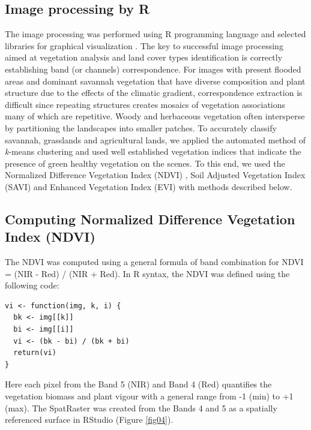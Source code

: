 \documentclass[remotesensing,article,submit,pdftex,moreauthors]{Definitions/mdpi}
\begin{document}
\subsection{Image processing by R}

The image processing was performed using R programming language \cite{RCoreTeam} and selected libraries for graphical visualization \cite{Murrell}. The key to successful image processing aimed at vegetation analysis and land cover types identification is correctly establishing band (or channels) correspondence. For images with present flooded areas and dominant savannah vegetation that have diverse composition and plant structure due to the effects of the climatic gradient, correspondence extraction is difficult since repeating structures creates mosaics of vegetation associations many of which are repetitive. Woody and herbaceous vegetation often intersperse by partitioning the landscapes into smaller patches. To accurately classify savannah, grasslands and agricultural lands, we applied the automated method of \emph{k}-means clustering and used well established vegetation indices that indicate the presence of green healthy vegetation on the scenes. To this end, we used the Normalized Difference Vegetation Index (NDVI) \cite{Tarpley}, Soil Adjusted Vegetation Index (SAVI) \cite{HUETE1988295,Huete} and Enhanced Vegetation Index (EVI) \cite{HUETE2002195} with methods described below. 

\subsection{Computing Normalized Difference Vegetation Index (NDVI)}
The NDVI was computed using a general formula of band combination for NDVI = (NIR - Red) / (NIR + Red). In R syntax, the NDVI was defined using the following code:

\begin{footnotesize}
\begin{verbatim}
vi <- function(img, k, i) {
  bk <- img[[k]]
  bi <- img[[i]]
  vi <- (bk - bi) / (bk + bi)
  return(vi)
}
\end{verbatim}
\end{footnotesize}

Here each pixel from the Band 5 (NIR) and Band 4 (Red) quantifies the vegetation biomass and plant vigour with a general range from -1 (min) to +1 (max). The SpatRaster was created from the Bands 4 and 5 as a spatially referenced surface in RStudio (Figure \ref{fig04}). 
\end{document}

